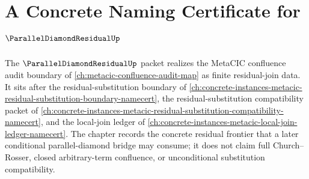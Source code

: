 \chapter{A Concrete Naming Certificate for $\ParallelDiamondResidualUp$}
\label{ch:concrete-instances-parallel-diamond-residual-namecert}

The $\ParallelDiamondResidualUp$ packet realizes the MetaCIC confluence audit boundary of \autoref{ch:metacic-confluence-audit-map} as finite residual-join data. It sits after the residual-substitution boundary of \autoref{ch:concrete-instances-metacic-residual-substitution-boundary-namecert}, the residual-substitution compatibility packet of \autoref{ch:concrete-instances-metacic-residual-substitution-compatibility-namecert}, and the local-join ledger of \autoref{ch:concrete-instances-metacic-local-join-ledger-namecert}. The chapter records the concrete residual frontier that a later conditional parallel-diamond bridge may consume; it does not claim full Church--Rosser, closed arbitrary-term confluence, or unconditional substitution compatibility.

